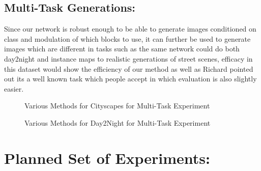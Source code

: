 \subsection{Multi-Task Generations: }
Since our network is robust enough to be able to generate images conditioned on class and modulation of which blocks to use, it can further be used to generate images which are different in tasks such as the same network could do both day2night and instance maps to realistic generations of street scenes, efficacy in this dataset would show the efficiency of our method as well as Richard pointed out its a well known task which people accept in which evaluation is also slightly easier.


\begin{figure}%
    \centering
    \caption{Various Methods for Cityscapes for Multi-Task Experiment}
    \label{fig:multi-task_cityscapes}
    \vspace{-3mm}
\end{figure}

\begin{figure}%
    \centering
    \caption{Various Methods for Day2Night for Multi-Task Experiment}
    \label{fig:multi-task_day2night}
    \vspace{-3mm}
\end{figure}


\section{Planned Set of Experiments:}
